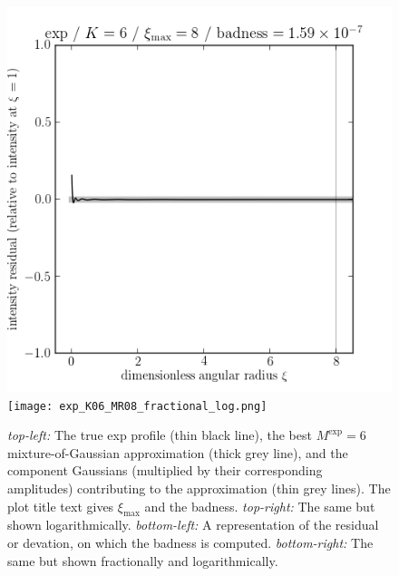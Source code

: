 \documentclass[12pt,pdftex,preprint]{aastex}
\newlength{\figurewidth}
\begin{document}
\begin{figure}
\includegraphics[width=\figurewidth]{exp_K06_MR08_residual.png}%
\texttt{[image: exp\_K06\_MR08\_fractional\_log.png]}
\caption{\textsl{top-left:} The true exp profile (thin black line),
  the best $M^{\exp}=6$ mixture-of-Gaussian approximation (thick grey
  line), and the component Gaussians (multiplied by their
  corresponding amplitudes) contributing to the approximation (thin
  grey lines).  The plot title text gives $\xi_{\max}$ and the
  badness. \textsl{top-right:} The same but shown logarithmically.
  \textsl{bottom-left:} A representation of the residual or devation,
  on which the badness is computed.  \textsl{bottom-right:} The same
  but shown fractionally and logarithmically.\label{fig:exp}}
\end{figure}
\end{document}
